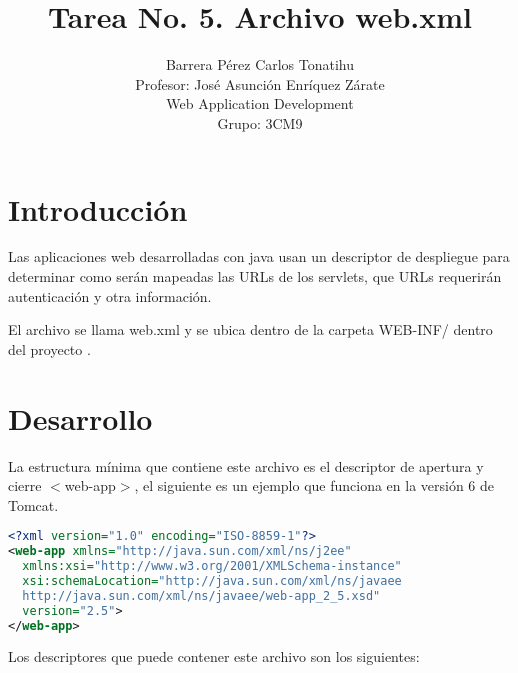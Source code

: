 \documentclass[12pt, titlepage]{article}
\title{Tarea No. 5. Archivo web.xml}
\author{Barrera Pérez Carlos Tonatihu \\ Profesor: José Asunción Enríquez Zárate 
\\ Web Application Development \\ Grupo: 3CM9 }
\begin{document}
\maketitle
\newpage
\tableofcontents
\newpage

\section{Introducción}
Las aplicaciones web desarrolladas con java usan un descriptor de despliegue 
para determinar como serán mapeadas las URLs de los servlets, que URLs 
requerirán autenticación y otra información.

El archivo se llama web.xml y se ubica dentro de la carpeta 
WEB-INF/ dentro del proyecto \cite{google}.

\section{Desarrollo}
La estructura mínima que contiene este archivo es el descriptor de apertura y 
cierre $<$web-app$>$, el siguiente es un ejemplo que funciona en la versión 6 
de Tomcat.

\begin{lstlisting}[language=XML, style=customXML]
<?xml version="1.0" encoding="ISO-8859-1"?>
<web-app xmlns="http://java.sun.com/xml/ns/j2ee"
  xmlns:xsi="http://www.w3.org/2001/XMLSchema-instance"
  xsi:schemaLocation="http://java.sun.com/xml/ns/javaee
  http://java.sun.com/xml/ns/javaee/web-app_2_5.xsd"
  version="2.5">
</web-app>
\end{lstlisting}

Los descriptores que puede contener este archivo son los siguientes:
\end{document}
